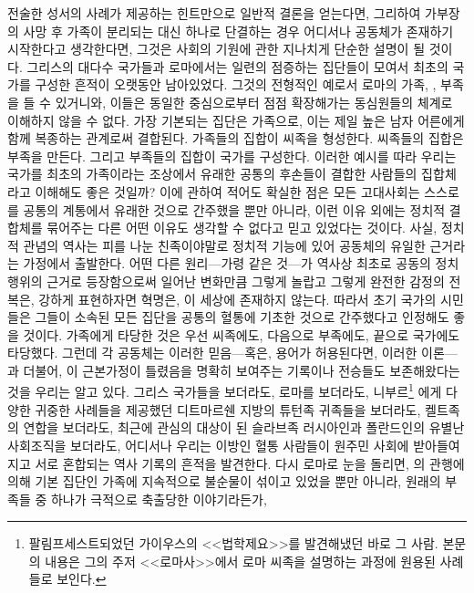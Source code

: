 전술한 성서의 사례가 제공하는 힌트만으로
일반적 결론을 얻는다면,
그리하여
가부장의 사망 후 가족이 분리되는 대신 하나로 단결하는 경우 어디서나
공동체가 존재하기 시작한다고 생각한다면,
그것은 사회의 기원에 관한 지나치게 단순한 설명이 될 것이다.
그리스의 대다수 국가들과 로마에서는
일련의 점증하는 집단들이 모여서 최초의 국가를 구성한
흔적이 오랫동안 남아있었다.
그것의 전형적인 예로서
로마의 가족, , 부족을
들 수 있거니와,
이들은 동일한 중심으로부터 점점 확장해가는 동심원들의 체계로
이해하지 않을 수 없다.
가장 기본되는 집단은 가족으로, 이는
제일 높은 남자 어른에게 함께 복종하는 관계로써 결합된다.
가족들의 집합이 씨족을 형성한다.
씨족들의 집합은 부족을 만든다.
그리고 부족들의 집합이 국가를 구성한다.
이러한 예시를 따라 우리는 국가를
최초의 가족이라는 조상에서 유래한 공통의 후손들이 결합한
사람들의 집합체라고 이해해도 좋은 것일까?
이에 관하여 적어도 확실한 점은
모든 고대사회는 스스로를 공통의 계통에서 유래한 것으로 간주했을 뿐만 아니라,
이런 이유 외에는 정치적 결합체를 묶어주는
다른 어떤 이유도 생각할 수 없다고 믿고 있었다는 것이다.
사실, 정치적 관념의 역사는
피를 나눈 친족이야말로
정치적 기능에 있어 공동체의 유일한 근거라는 가정에서 출발한다.
어떤 다른 원리---가령 
같은 것---가 역사상 최초로 공동의 정치행위의 근거로 등장함으로써
일어난 변화만큼 그렇게 놀랍고 그렇게 완전한 감정의 전복은,
강하게 표현하자면 혁명은, 이 세상에 존재하지 않는다.
따라서 초기 국가의 시민들은
그들이 소속된 모든 집단을 공통의 혈통에 기초한 것으로 간주했다고
인정해도 좋을 것이다.
가족에게 타당한 것은 우선 씨족에도, 다음으로 부족에도, 끝으로 국가에도 타당했다.
그런데
각 공동체는
이러한 믿음---혹은, 용어가 허용된다면, 이러한 이론---과 더불어,
이 근본가정이 틀렸음을 명확히 보여주는 기록이나 전승들도
보존해왔다는 것을 우리는 알고 있다.
그리스 국가들을 보더라도, 로마를 보더라도,
니부르\footnote{팔림프세스트되었던
  가이우스의 <<법학제요>>를 발견해냈던 바로 그 사람. 본문의 내용은
  그의 주저 <<로마사>>에서 로마 씨족을 설명하는 과정에 원용된 사례들로 보인다.}%
에게 다양한 귀중한 사례들을 제공했던
디트마르쉔 지방의 튜턴족 귀족들을 보더라도,
켈트족의 연합을 보더라도,
최근에 관심의 대상이 된
슬라브족 러시아인과 폴란드인의 유별난 사회조직을 보더라도,
어디서나 우리는
이방인 혈통 사람들이 원주민 사회에 받아들여지고 서로 혼합되는
역사 기록의 흔적을 발견한다.
다시 로마로 눈을 돌리면,
의 관행에 의해
기본 집단인 가족에 지속적으로
불순물이 섞이고 있었을 뿐만 아니라,
원래의 부족들 중 하나가 극적으로 축출당한 이야기라든가,%
